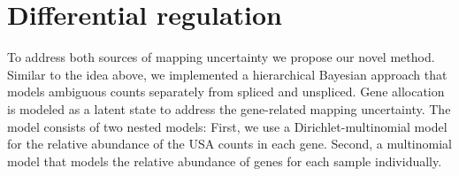 \section{Differential regulation}
To address both sources of mapping uncertainty we propose our novel method. Similar to the idea above, we implemented a hierarchical Bayesian approach that models ambiguous counts separately from spliced and unspliced. Gene allocation is modeled as a latent state to address the gene-related mapping uncertainty. The model consists of two nested models: First, we use a Dirichlet-multinomial model for the relative abundance of the USA counts in each gene. Second, a multinomial model that models the relative abundance of genes for each sample individually.


